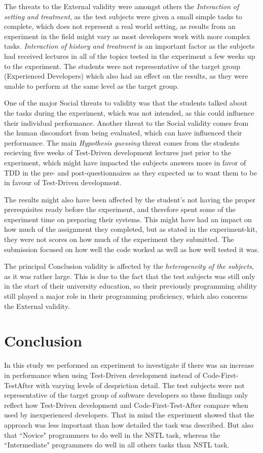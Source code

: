 \documentclass{sig-alternate-05-2015}
\begin{document}
The threats to the External validity were amongst others the \textit{Interaction of setting and treatment}, as the test subjects were given a small simple tasks to complete, which does not represent a real world setting, as results from an experiment in the field might vary as most developers work with more complex tasks. \textit{Interaction of history and treatment} is an important factor as the subjects had received lectures in all of the topics tested in the experiment a few weeks up to the experiment. The students were not representative of the target group (Experienced Developers) which also had an effect on the results, as they were unable to perform at the same level as the target group.

One of the major Social threats to validity was that the students talked about the tasks during the experiment, which was not intended, as this could influence their individual performance. Another threat to the Social validity comes from the human discomfort from being evaluated\cite{henchy1}, which can have influenced their performance. The main \textit{Hypothesis guessing} threat comes from the students recieving five weeks of Test-Driven development lectures just prior to the experiment, which might have impacted the subjects answers more in favor of TDD in the pre- and post-questionnaires as they expected us to want them to be in favour of Test-Driven development. 

The results might also have been affected by the student's not having the proper prerequisites ready before the experiment, and therefore spent some of the experiment time on preparing their systems. This might have had an impact on how much of the assignment they completed, but as stated in the experiment-kit, they were not scores on how much of the experiment they submitted. The submission focused on how well the code worked as well as how well tested it was.

The principal Conclusion validity is affected by the \textit{heterogeneity of the subjects}, as it was rather large. This is due to the fact that the test subjects was still only in the start of their university education, so their previously programming ability still played a major role in their programming proficiency, which also concerns the External validity. 

\section{Conclusion}
\label{sec:Conclusion}
In this study we performed an experiment to investigate if there was an increase in performance when using Test-Driven development instead of Code-First-TestAfter with varying levels of despriction detail. The test subjects were not representative of the target group of software developers so these findings only reflect how Test-Driven development and Code-First-Test-After compare when used by inexperienced developers. That in mind the experiment showed that the approach was less important than how detailed the task was described. But also that ``Novice" programmers to do well in the NSTL task, whereas the ``Intermediate" programmers do well in all others tasks than NSTL task.
\end{document}

